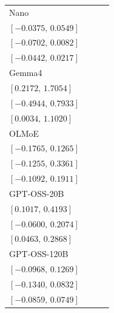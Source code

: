 \begin{tabular*}{\linewidth}{@{\extracolsep{\fill}}lccc@{}}
Nano & \begin{tabular}[t]{@{}c@{}}\(0.0090\)\\\([-0.0375,\,0.0549]\)\end{tabular} & \begin{tabular}[t]{@{}c@{}}\(-0.0307\)\\\([-0.0702,\,0.0082]\)\end{tabular} & \begin{tabular}[t]{@{}c@{}}\(-0.0108\)\\\([-0.0442,\,0.0217]\)\end{tabular}\\[2pt]
Gemma4 & \begin{tabular}[t]{@{}c@{}}\(0.9582\)\\\([0.2172,\,1.7054]\)\end{tabular} & \begin{tabular}[t]{@{}c@{}}\(0.1395\)\\\([-0.4944,\,0.7933]\)\end{tabular} & \begin{tabular}[t]{@{}c@{}}\(0.5488\)\\\([0.0034,\,1.1020]\)\end{tabular}\\[2pt]
OLMoE & \begin{tabular}[t]{@{}c@{}}\(-0.0254\)\\\([-0.1765,\,0.1265]\)\end{tabular} & \begin{tabular}[t]{@{}c@{}}\(0.1043\)\\\([-0.1255,\,0.3361]\)\end{tabular} & \begin{tabular}[t]{@{}c@{}}\(0.0394\)\\\([-0.1092,\,0.1911]\)\end{tabular}\\[2pt]
GPT-OSS-20B & \begin{tabular}[t]{@{}c@{}}\(0.2588\)\\\([0.1017,\,0.4193]\)\end{tabular} & \begin{tabular}[t]{@{}c@{}}\(0.0719\)\\\([-0.0600,\,0.2074]\)\end{tabular} & \begin{tabular}[t]{@{}c@{}}\(0.1653\)\\\([0.0463,\,0.2868]\)\end{tabular}\\[2pt]
GPT-OSS-120B & \begin{tabular}[t]{@{}c@{}}\(0.0136\)\\\([-0.0968,\,0.1269]\)\end{tabular} & \begin{tabular}[t]{@{}c@{}}\(-0.0245\)\\\([-0.1340,\,0.0832]\)\end{tabular} & \begin{tabular}[t]{@{}c@{}}\(-0.0055\)\\\([-0.0859,\,0.0749]\)\end{tabular}\\[2pt]
\bottomrule
\end{tabular*}%
\endgroup%
